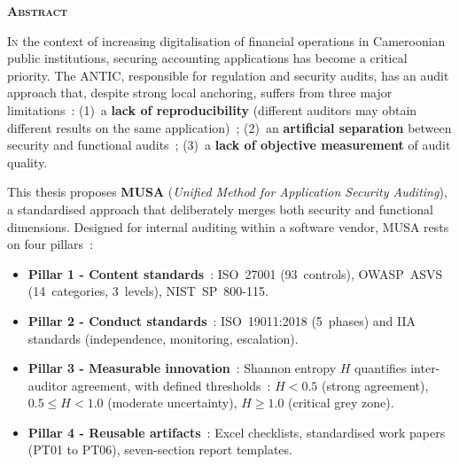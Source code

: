 \documentclass[12pt,a4paper,oneside]{report}
\begin{document}
\thispagestyle{plain}
\begin{flushright}
	{\Huge\bfseries\scshape\color{navy} Abstract}
\end{flushright}
\vspace{0.2cm}
\lettrine[lines=3,lhang=0.1,loversize=0.1]{\color{navy}I}{n} the context of
increasing digitalisation of financial operations in Cameroonian public
institutions, securing accounting applications has become a critical priority.
The ANTIC, responsible for regulation and security audits, has an audit
approach that, despite strong local anchoring, suffers from three major
limitations~: (1)~a \textbf{lack of reproducibility} (different auditors
may obtain different results on the same application)~; (2)~an
\textbf{artificial separation} between security and functional audits~;
(3)~a \textbf{lack of objective measurement} of audit quality.

\medskip
This thesis proposes \textbf{MUSA} (\textit{Unified Method for Application
	Security Auditing}), a standardised approach that deliberately merges both
security and functional dimensions. Designed for internal auditing within
a software vendor, MUSA rests on four pillars~:

\begin{itemize}[label={\color{gold}}, leftmargin=2em, itemsep=2pt]
	\item \textbf{Pillar 1 - Content standards}~: ISO~27001
	(93~controls), OWASP~ASVS (14~categories, 3~levels),
	NIST~SP~800-115.
	
	\item \textbf{Pillar 2 - Conduct standards}~: ISO~19011:2018
	(5~phases) and IIA standards (independence, monitoring, escalation).
	
	\item \textbf{Pillar 3 - Measurable innovation}~: Shannon entropy
	$H$ quantifies inter-auditor agreement, with defined thresholds~:
	$H < 0.5$ (strong agreement), $0.5 \leq H < 1.0$ (moderate
	uncertainty), $H \geq 1.0$ (critical grey zone).
	
	\item \textbf{Pillar 4 - Reusable artifacts}~: Excel checklists,
	standardised work papers (PT01 to PT06), seven-section report
	templates.
\end{itemize}
\end{document}
